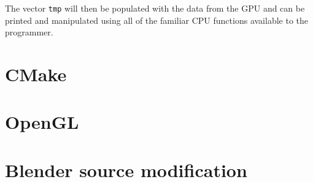 The vector \verb|tmp| will then be populated with the data from the GPU and can
be printed and manipulated using all of the familiar CPU functions available to
the programmer. 

\section{CMake}

\section{OpenGL}
\section{Blender source modification}



